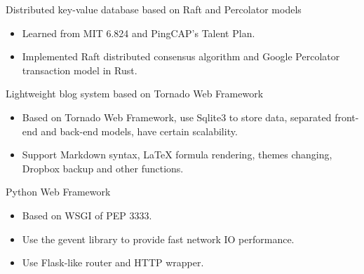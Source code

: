 \documentclass{resume}
\newcommand{\en}[1]{#1}
\newcommand{\zh}[1]{}
\begin{document}
\en{Distributed key-value database based on Raft and Percolator models}
\zh{基于 Raft 与 Percolator 模型的分布式键值数据库}
\begin{itemize}
      \item \en{Learned from MIT 6.824 and PingCAP's Talent Plan.}
            \zh{学习 MIT 6.824 和 PingCAP Talent Plan 后完成}
      \item \en{Implemented Raft distributed consensus algorithm and Google Percolator transaction model in Rust.}
            \zh{使用 Rust 开发，基于 Raft 分布式共识算法和 Google Percolator 事务模型实现}
\end{itemize}

\en{Lightweight blog system based on Tornado Web Framework}
\zh{基于 Tornado Web Framework 的轻量级博客系统}
\begin{itemize}
      \item \en{Based on Tornado Web Framework, use Sqlite3 to store data, separated front-end and back-end models, have certain scalability.}
            \zh{基于 Tornado Web Framework 开发，使用 Sqlite3 存储数据，前后端分离，有一定扩展性}
      \item \en{Support Markdown syntax, LaTeX formula rendering, themes changing, Dropbox backup and other functions.}
            \zh{支持 Markdown 语法，LaTeX 公式渲染，主题更换以及 Dropbox 备份等功能}
\end{itemize}

\en{Python Web Framework}
\zh{Python Web 框架}
\begin{itemize}
      \item \en{Based on WSGI of PEP 3333.}
            \zh{基于 PEP 3333 的 WSGI 实现}
      \item \en{Use the gevent library to provide fast network IO performance.}
            \zh{使用 gevent 库提供快速的网络 IO 表现}
      \item \en{Use Flask-like router and HTTP wrapper.}
            \zh{使用了类 Flask 的路由功能和 HTTP 封装}
\end{itemize}

\end{document}
